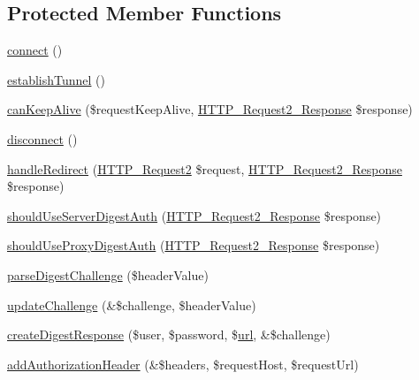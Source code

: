 \subsection*{Protected Member Functions}
\begin{DoxyCompactItemize}
\item 
\hyperlink{classHTTP__Request2__Adapter__Socket_a84b2a17c74b0dc0eb8ac7403adbeffc9}{connect} ()
\item 
\hyperlink{classHTTP__Request2__Adapter__Socket_a924bbeb198c174580c109eb563079296}{establish\+Tunnel} ()
\item 
\hyperlink{classHTTP__Request2__Adapter__Socket_a5171c1e7af2244777b09a8078ed5c667}{can\+Keep\+Alive} (\$request\+Keep\+Alive, \hyperlink{classHTTP__Request2__Response}{H\+T\+T\+P\+\_\+\+Request2\+\_\+\+Response} \$response)
\item 
\hyperlink{classHTTP__Request2__Adapter__Socket_a20cf7acb1fb9f0f80929ec368fc4ff8f}{disconnect} ()
\item 
\hyperlink{classHTTP__Request2__Adapter__Socket_aa60407169d7f2faee49d32a6d48d1f3e}{handle\+Redirect} (\hyperlink{classHTTP__Request2}{H\+T\+T\+P\+\_\+\+Request2} \$request, \hyperlink{classHTTP__Request2__Response}{H\+T\+T\+P\+\_\+\+Request2\+\_\+\+Response} \$response)
\item 
\hyperlink{classHTTP__Request2__Adapter__Socket_a3d9def9a7ef3725d00b81fa224eedeb3}{should\+Use\+Server\+Digest\+Auth} (\hyperlink{classHTTP__Request2__Response}{H\+T\+T\+P\+\_\+\+Request2\+\_\+\+Response} \$response)
\item 
\hyperlink{classHTTP__Request2__Adapter__Socket_af26e1fe3de20a109ff76fbadab10ec28}{should\+Use\+Proxy\+Digest\+Auth} (\hyperlink{classHTTP__Request2__Response}{H\+T\+T\+P\+\_\+\+Request2\+\_\+\+Response} \$response)
\item 
\hyperlink{classHTTP__Request2__Adapter__Socket_a271d3c7e7ce64e2acc6f560187c8a7cb}{parse\+Digest\+Challenge} (\$header\+Value)
\item 
\hyperlink{classHTTP__Request2__Adapter__Socket_abe6b620d64a56d799cd9367aedf3c0e6}{update\+Challenge} (\&\$challenge, \$header\+Value)
\item 
\hyperlink{classHTTP__Request2__Adapter__Socket_a8eeccb83fca751fd43b3035e31243940}{create\+Digest\+Response} (\$user, \$password, \$\hyperlink{swfupload_8js_a440a52a9004fdab0700100a6ddb49f67}{url}, \&\$challenge)
\item 
\hyperlink{classHTTP__Request2__Adapter__Socket_af09e76396d487dae2bfc85b789c8f73b}{add\+Authorization\+Header} (\&\$headers, \$request\+Host, \$request\+Url)

\end{DoxyCompactItemize}
